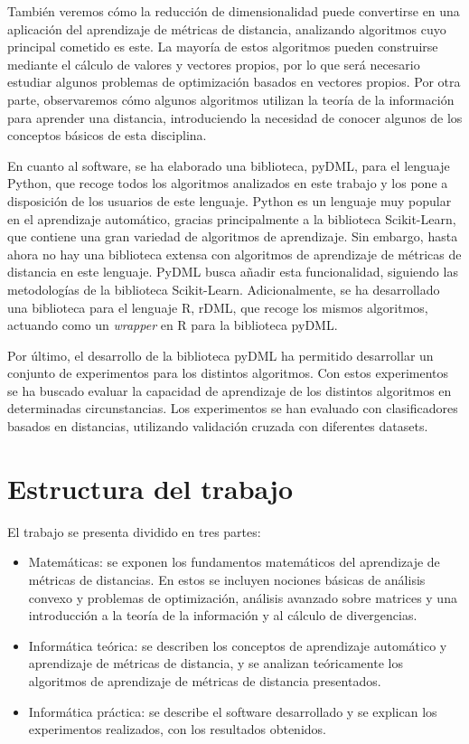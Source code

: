 También veremos cómo la reducción de dimensionalidad puede convertirse en una aplicación del aprendizaje de métricas de distancia, analizando algoritmos cuyo principal cometido es este. La mayoría de estos algoritmos pueden construirse mediante el cálculo de valores y vectores propios, por lo que será necesario estudiar algunos problemas de optimización basados en vectores propios. Por otra parte, observaremos cómo algunos algoritmos utilizan la teoría de la información para aprender una distancia, introduciendo la necesidad de conocer algunos de los conceptos básicos de esta disciplina.

En cuanto al software, se ha elaborado una biblioteca, pyDML, para el lenguaje Python, que recoge todos los algoritmos analizados en este trabajo y los pone a disposición de los usuarios de este lenguaje. Python es un lenguaje muy popular en el aprendizaje automático, gracias principalmente a la biblioteca Scikit-Learn, que contiene una gran variedad de algoritmos de aprendizaje. Sin embargo, hasta ahora no hay una biblioteca extensa con algoritmos de aprendizaje de métricas de distancia en este lenguaje. PyDML busca añadir esta funcionalidad, siguiendo las metodologías de la biblioteca Scikit-Learn. Adicionalmente, se ha desarrollado una biblioteca para el lenguaje R, rDML, que recoge los mismos algoritmos, actuando como un \emph{wrapper} en R para la biblioteca pyDML.

Por último, el desarrollo de la biblioteca pyDML ha permitido desarrollar un conjunto de experimentos para los distintos algoritmos. Con estos experimentos se ha buscado evaluar la capacidad de aprendizaje de los distintos algoritmos en determinadas circunstancias. Los experimentos se han evaluado con clasificadores basados en distancias, utilizando validación cruzada con diferentes datasets.

\section{Estructura del trabajo}

El trabajo se presenta dividido en tres partes:

\begin{itemize}
    \item Matemáticas: se exponen los fundamentos matemáticos del aprendizaje de métricas de distancias. En estos se incluyen nociones básicas de análisis convexo y problemas de optimización, análisis avanzado sobre matrices y una introducción a la teoría de la información y al cálculo de divergencias.
    \item Informática teórica: se describen los conceptos de aprendizaje automático y aprendizaje de métricas de distancia, y se analizan teóricamente los algoritmos de aprendizaje de métricas de distancia presentados.
    \item Informática práctica: se describe el software desarrollado y se explican los experimentos realizados, con los resultados obtenidos.
\end{itemize}

